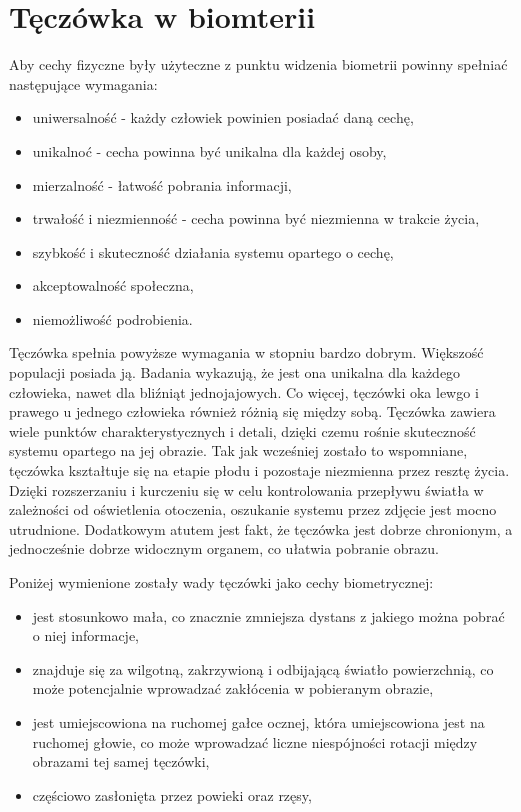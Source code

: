 \documentclass[10pt,polish,a4paper,oneside]{ppfcmthesis}
\begin{document}
\section{Tęczówka w biomterii}

Aby cechy fizyczne były użyteczne z punktu widzenia biometrii powinny spełnia\'c następujące
wymagania:

\begin{itemize}
  \item uniwersalnoś\'c - każdy człowiek powinien posiada\'c daną cechę,
  \item unikalno\'c - cecha powinna by\'c unikalna dla każdej osoby,
  \item mierzalnoś\'c - łatwoś\'c pobrania informacji,
  \item trwałoś\'c i niezmiennoś\'c - cecha powinna by\'c niezmienna w trakcie życia,
  \item szybkoś\'c i skutecznoś\'c działania systemu opartego o cechę,
  \item akceptowalnoś\'c społeczna,
  \item niemożliwoś\'c podrobienia.
\end{itemize}

Tęczówka spełnia powyższe wymagania w stopniu bardzo dobrym. Większoś\'c populacji posiada
ją. Badania wykazują, że jest ona unikalna dla każdego człowieka, nawet dla bli\'zniąt jednojajowych.
Co więcej, tęczówki oka lewgo i prawego u jednego człowieka również różnią się między sobą. Tęczówka zawiera
wiele punktów charakterystycznych i detali, dzięki czemu rośnie skutecznoś\'c systemu opartego na jej obrazie.
Tak jak wcześniej zostało to wspomniane, tęczówka kształtuje się na etapie płodu i pozostaje niezmienna
przez resztę życia. Dzięki rozszerzaniu i kurczeniu się w celu kontrolowania przepływu światła w zależności
od oświetlenia otoczenia, oszukanie systemu przez zdjęcie jest mocno utrudnione. Dodatkowym atutem
jest fakt, że tęczówka jest dobrze chronionym, a jednocześnie dobrze widocznym organem, co ułatwia
pobranie obrazu.\newline

\noindent
Poniżej wymienione zostały wady tęczówki jako cechy biometrycznej:

\begin{itemize}
  \item jest stosunkowo mała, co znacznie zmniejsza dystans z jakiego można pobra\'c o niej informacje,
  \item znajduje się za wilgotną, zakrzywioną i odbijającą światło powierzchnią, co może potencjalnie
  wprowadza\'c zakłócenia w pobieranym obrazie,
  \item jest umiejscowiona na ruchomej gałce ocznej, która umiejscowiona jest na ruchomej głowie, co może
  wprowadza\'c liczne niespójności rotacji między obrazami tej samej tęczówki,
  \item częściowo zasłonięta przez powieki oraz rzęsy,
\end{itemize}
\end{document}
